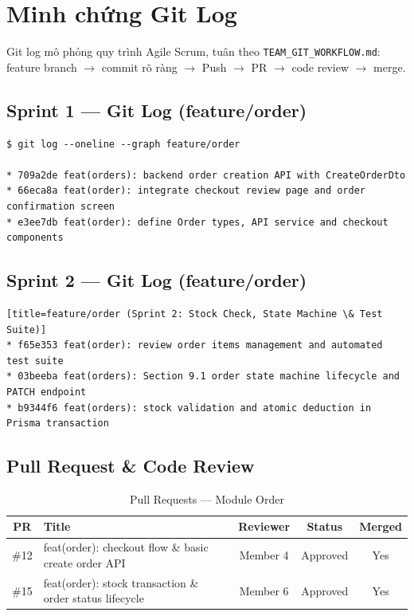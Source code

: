 \documentclass[12pt,a4paper]{article}
\begin{document}
\section{Minh chứng Git Log}

Git log mô phỏng quy trình Agile Scrum, tuân theo \texttt{TEAM\_GIT\_WORKFLOW.md}: feature branch $\to$ commit rõ ràng $\to$ Push $\to$ PR $\to$ code review $\to$ merge.

\subsection{Sprint 1 — Git Log (feature/order)}

\begin{lstlisting}[title=feature/order (Sprint 1: Checkout Flow \& Endpoints)]
$ git log --oneline --graph feature/order

* 709a2de feat(orders): backend order creation API with CreateOrderDto
* 66eca8a feat(order): integrate checkout review page and order confirmation screen
* e3ee7db feat(order): define Order types, API service and checkout components
\end{lstlisting}

\subsection{Sprint 2 — Git Log (feature/order)}

\begin{lstlisting}[title=feature/order (Sprint 2: Stock Check, State Machine \& Test Suite)]
* f65e353 feat(order): review order items management and automated test suite
* 03beeba feat(orders): Section 9.1 order state machine lifecycle and PATCH endpoint
* b9344f6 feat(orders): stock validation and atomic deduction in Prisma transaction
\end{lstlisting}

\subsection{Pull Request \& Code Review}

\begin{table}[H]
\centering
\caption{Pull Requests — Module Order}
\begin{tabular}{clccc}
\toprule
\textbf{PR} & \textbf{Title} & \textbf{Reviewer} & \textbf{Status} & \textbf{Merged} \\
\midrule
\#12 & feat(order): checkout flow \& basic create order API & Member 4 & Approved & Yes \\
\#15 & feat(order): stock transaction \& order status lifecycle & Member 6 & Approved & Yes \\
\bottomrule
\end{tabular}
\end{table}
\end{document}
